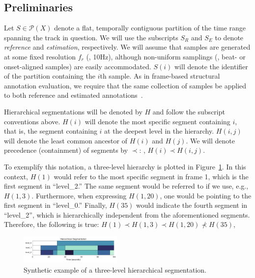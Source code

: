\documentclass{article}
\begin{document}
\subsection{Preliminaries}


Let $S \in \mathcal{P}(X)$ denote a flat, temporally contiguous partition of the time range spanning the track in question.
We will use the subscripts $S_R$ and $S_E$ to denote \emph{reference} and \emph{estimation}, respectively.
We will assume that samples are generated at some fixed resolution $f_r$ (\eg, 10Hz), although non-uniform samplings (\eg, beat- or onset-aligned samples) are easily accommodated.  
$S(i)$ will denote the identifier of the partition containing the $i$th sample.
As in frame-based structural annotation evaluation, we require that the same collection of samples be applied to both reference and estimated annotations~\cite{levy2008structural}.

Hierarchical segmentations will be denoted by $H$ and follow the subscript conventions above.
$H(i)$ will denote the most specific segment containing $i$, that is, the segment containing $i$ at the deepest level in the hierarchy.
$H(i, j)$ will denote the least common ancestor of $H(i)$ and $H(j)$.
We will denote precedence (containment) of segments by $\prec$: \eg, $H(i) \prec H(i, j)$. 

To exemplify this notation, a three-level hierarchy is plotted in Figure~\ref{fig:hier-example}.
In this context, $H(1)$ would refer to the most specific segment in frame 1, which is the first segment in ``level\_2.''
The same segment would be referred to if we use, e.g., $H(1,3)$.
Furthermore, when expressing $H(1, 20)$, one would be pointing to the first segment in ``level\_0.''
Finally, $H(35)$ would indicate the fourth segment in ``level\_2'', which is hierarchically independent from the aforementioned segments.
Therefore, the following is true: $H(1) \prec H(1, 3) \prec H(1, 20) \nprec H(35)$, 

\begin{figure}
  \centering
  \includegraphics[width=0.45\textwidth]{figs/hier-example.pdf}
  \caption{Synthetic example of a three-level hierarchical segmentation.}
  \label{fig:hier-example}
\end{figure}
\end{document}
